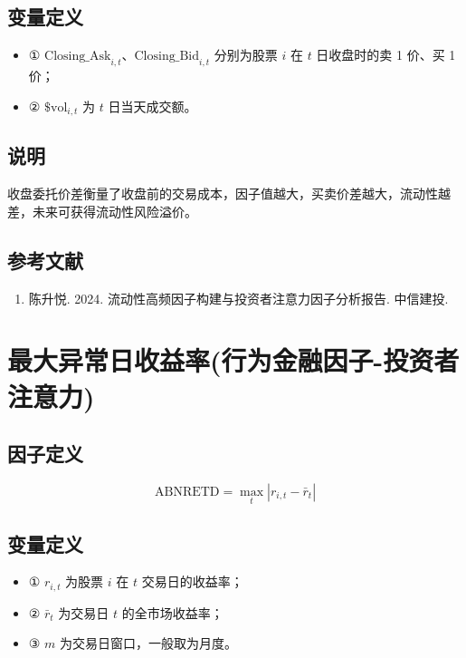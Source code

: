 \documentclass{article}
\begin{document}
\subsection{变量定义}
\begin{itemize}
    \item ① \( \mathrm{Closing\_Ask}_{i,t} \)、\( \mathrm{Closing\_Bid}_{i,t} \) 分别为股票 \( i \) 在 \( t \) 日收盘时的卖 1 价、买 1 价；
    \item ② \( \$ \mathrm{vol}_{i,t} \) 为 \( t \) 日当天成交额。
\end{itemize}

\subsection{说明}
收盘委托价差衡量了收盘前的交易成本，因子值越大，买卖价差越大，流动性越差，未来可获得流动性风险溢价。

\subsection{参考文献}
\begin{enumerate}
    \item 陈升悦. 2024. 流动性高频因子构建与投资者注意力因子分析报告. 中信建投.
\end{enumerate}

\section{最大异常日收益率(行为金融因子-投资者注意力)}

\subsection{因子定义}
\begin{equation}
    \mathrm{ABNRETD} = \max_t |r_{i,t} - \bar{r}_t|
\end{equation}

\subsection{变量定义}
\begin{itemize}
    \item ① \( r_{i,t} \) 为股票 \( i \) 在 \( t \) 交易日的收益率；
    \item ② \( \bar{r}_t \) 为交易日 \( t \) 的全市场收益率；
    \item ③ \( m \) 为交易日窗口，一般取为月度。
\end{itemize}
\end{document}
